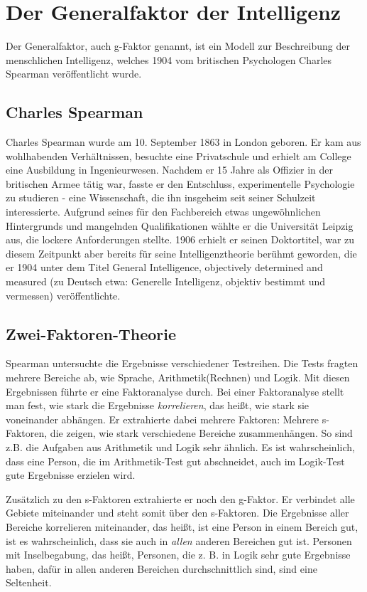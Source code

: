 \chapter{Der Generalfaktor der Intelligenz}

Der Generalfaktor, auch g-Faktor genannt, ist ein Modell zur Beschreibung der
menschlichen Intelligenz, welches 1904 vom britischen Psychologen
Charles Spearman veröffentlicht wurde. \cite{wiki_spearman}

\section{Charles Spearman}
Charles Spearman wurde am 10. September 1863 in London geboren. \cite{wiki_spearman} Er kam aus wohlhabenden Verhältnissen, besuchte eine Privatschule und erhielt am College eine Ausbildung in Ingenieurwesen. Nachdem er 15 Jahre als Offizier in der britischen Armee tätig war, fasste er den Entschluss, experimentelle Psychologie zu studieren - eine Wissenschaft, die ihn insgeheim seit seiner Schulzeit interessierte. \cite{galton_spearman} Aufgrund seines für den Fachbereich etwas ungewöhnlichen Hintergrunds und mangelnden Qualifikationen wählte er die Universität Leipzig aus, die lockere Anforderungen stellte. 1906 erhielt er seinen Doktortitel, war zu diesem Zeitpunkt aber bereits für seine Intelligenztheorie berühmt geworden, die er 1904 unter dem Titel \glqq General Intelligence, objectively determined and measured\grqq{} (zu Deutsch etwa: Generelle Intelligenz, objektiv bestimmt und vermessen) veröffentlichte.
\cite{wiki_en_spearman} \cite{york_spearman}

\section{Zwei-Faktoren-Theorie}
Spearman untersuchte die Ergebnisse verschiedener Testreihen. Die Tests fragten mehrere Bereiche ab, wie Sprache, Arithmetik(Rechnen) und Logik. Mit diesen Ergebnissen führte er eine Faktoranalyse durch. Bei einer Faktoranalyse stellt man fest, wie stark die Ergebnisse \emph{korrelieren}, das heißt, wie stark sie voneinander abhängen. Er extrahierte dabei mehrere Faktoren: Mehrere s-Faktoren, die zeigen, wie stark verschiedene Bereiche zusammenhängen. So sind z.B. die Aufgaben aus Arithmetik und Logik sehr ähnlich. Es ist wahrscheinlich, dass eine Person, die im Arithmetik-Test gut abschneidet, auch im Logik-Test gute Ergebnisse erzielen wird.

Zusätzlich zu den s-Faktoren extrahierte er noch den g-Faktor. Er verbindet alle Gebiete miteinander und steht somit über den s-Faktoren. Die Ergebnisse aller Bereiche korrelieren miteinander, das heißt, ist eine Person in einem Bereich gut, ist es wahrscheinlich, dass sie auch in \emph{allen} anderen Bereichen gut ist. Personen mit Inselbegabung, das heißt, Personen, die z. B. in Logik sehr gute Ergebnisse haben, dafür in allen anderen Bereichen durchschnittlich sind, sind eine Seltenheit.

